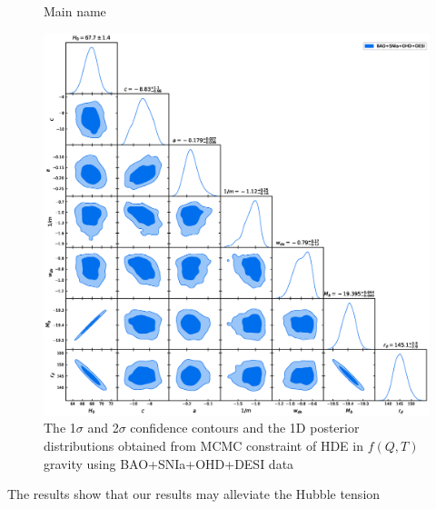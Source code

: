 \documentclass[preprint]{aastex631}
\begin{document}
\begin{figure}[h]
    \centering
    \caption{Main name}
    \label{Fig2.main}
\end{figure}


\begin{figure}
    \centering
    \includegraphics[width=1\linewidth]{./pic/getdist.eps}
    \caption{\label{fig:constraint} The 1$\sigma$ and 2$\sigma$ confidence contours and the 1D posterior distributions obtained from MCMC constraint of HDE in $f(Q,T)$ gravity using BAO+SNIa+OHD+DESI data}
\end{figure}
The results show that our results may alleviate the Hubble tension
\end{document}
